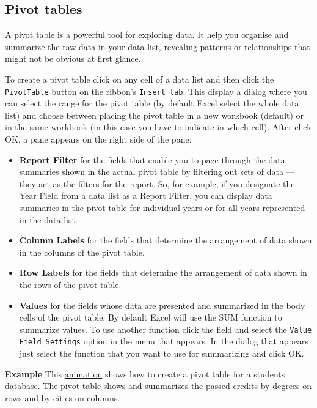 \subsection{Pivot tables}\hypertarget{pivot-tables}{}\label{pivot-tables}

A pivot table is a powerful tool for exploring data. It help you organise and summarize the raw data in your data list, revealing patterns or relationships that might not be obvious at first glance.

To create a pivot table click on any cell of a data list and then click the \texttt{PivotTable} button on the ribbon’s \texttt{Insert tab}. This display a dialog where you can select the range for the pivot table (by default Excel select the whole data list) and choose between placing the pivot table in a new workbook (default) or in the same workbook (in this case you have to indicate in which cell). After click OK, a pane appears on the right side of the pane:

\begin{itemize}
\item \textbf{Report Filter} for the fields that enable you to page through the data
summaries shown in the actual pivot table by filtering out sets of data —
they act as the filters for the report. So, for example, if you designate the
Year Field from a data list as a Report Filter, you can display data summaries in the pivot table for individual years or for all years represented
in the data list.
\item \textbf{Column Labels} for the fields that determine the arrangement of data shown in the columns of the pivot table.
\item \textbf{Row Labels} for the fields that determine the arrangement of data shown in the rows of the pivot table.
\item \textbf{Values} for the fields whose data are presented and summarized in the body cells of the pivot table. By default Excel will use the SUM function to summarize values. To use another function click the field and select the \texttt{Value Field Settings} option in the menu that appears. In the dialog that appears just select the function that you want to use for summarizing and click OK.
\end{itemize}

\textbf{Example} This \href{http://aprendeconalf.es/office/excel/manual/img/example_pivot_table_1.gif}{animation} shows how to create a pivot table for a students database. The pivot table shows and summarizes the passed credits by degrees on rows and by cities on columns.

